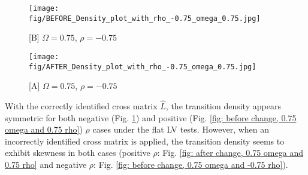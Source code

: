 \documentclass[12pt]{article}
\begin{document}
\begin{figure}[ht]
    \vspace{1em}

    \begin{minipage}{0.45\textwidth}
        \centering
        \texttt{[image: fig/BEFORE\_Density\_plot\_with\_rho\_-0.75\_omega\_0.75.jpg]}
        \caption{[B] \(\Omega = 0.75\), \(\rho = -0.75\)} \label{fig: before change, 0.75 omega and -0.75 rho}
    \end{minipage}
    \hfill
    \begin{minipage}{0.45\textwidth}
        \centering
        \texttt{[image: fig/AFTER\_Density\_plot\_with\_rho\_-0.75\_omega\_0.75.jpg]}
        \caption{[A] \(\Omega = 0.75\), \(\rho = -0.75\)} \label{fig: after change, 0.75 omega and -0.75 rho}
    \end{minipage}
\end{figure}

With the correctly identified cross matrix \(\hat{L}\), the transition density appears symmetric for both negative (Fig. \ref{fig: after change, 0.75 omega and -0.75 rho}) and positive (Fig. \ref{fig: before change, 0.75 omega and 0.75 rho}) \(\rho\) cases under the flat LV tests. However, when an incorrectly identified cross matrix is applied, the transition density seems to exhibit skewness in both cases (positive \(\rho\): Fig. \ref{fig: after change, 0.75 omega and 0.75 rho} and negative \(\rho\): Fig. \ref{fig: before change, 0.75 omega and -0.75 rho}).
\end{document}
